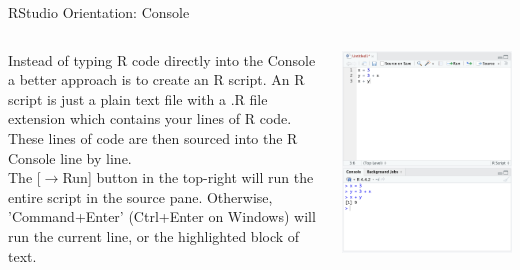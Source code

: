 \documentclass[aspectratio=169,xcolor=dvipsnames]{beamer}
\begin{document}
\begin{frame}{RStudio Orientation: Console}
\begin{columns}
        \begin{column}{0.5\textwidth}
            Instead of typing R code directly into the Console a better approach is to create an R script.
             An R script is just a plain text file with a .R file extension which contains your lines of R code. 
             These lines of code are then sourced into the R Console line by line. \\
             \vspace{0.5cm}
             The [$\rightarrow$Run] button in the top-right will run the entire script in the source pane. Otherwise, 'Command+Enter' (Ctrl+Enter on Windows) will run the current line, or the highlighted block of text.
        \end{column}

        \begin{column}{0.5\textwidth}
            \centering
            \includegraphics[scale=0.32]{images/source.png}
        \end{column}
    \end{columns}
\end{frame}
\end{document}
